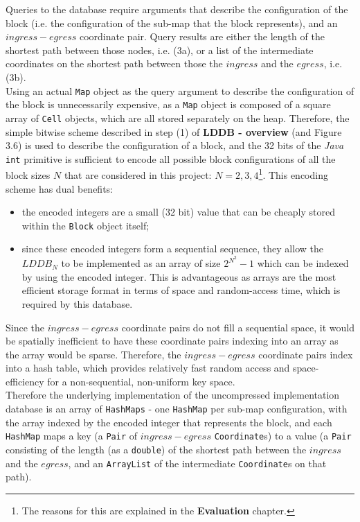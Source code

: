 \documentclass[12pt,notitlepage]{report}
\begin{document}
\noindent
Queries to the database require arguments that describe the configuration of the block (i.e. the configuration of the sub-map that the block represents), and an $ingress-egress$ coordinate pair. Query results are either the length of the shortest path between those nodes, i.e. (3a), or a list of the intermediate coordinates on the shortest path between those the $ingress$ and the $egress$, i.e. (3b).\\

\noindent
Using an actual {\tt Map} object as the query argument to describe the configuration of the block is unnecessarily expensive, as a {\tt Map} object is composed of a square array of {\tt Cell} objects, which are all stored separately on the heap. Therefore, the simple bitwise scheme described in step (1) of {\bfseries LDDB - overview} (and Figure 3.6) is used to describe the configuration of a block, and the 32 bits of the {\em Java} {\tt int} primitive is sufficient to encode all possible block configurations of all the block sizes $N$ that are considered in this project: $N=2, 3, 4$\footnote{The reasons for this are explained in the {\bfseries Evaluation} chapter.}. This encoding scheme has dual benefits:
\begin{itemize}
\item the encoded integers are a small (32 bit) value that can be cheaply stored within the {\tt Block} object itself;
\item since these encoded integers form a sequential sequence, they allow the $LDDB_{N}$ to be implemented as an array of size $2^{N^{2}}-1$ which can be indexed by using the encoded integer. This is advantageous as arrays are the most efficient storage format in terms of space and random-access time, which is required by this database.
\end{itemize}

\noindent
Since the $ingress-egress$ coordinate pairs do not fill a sequential space, it would be spatially inefficient to have these coordinate pairs indexing into an array as the array would be sparse. Therefore, the $ingress-egress$ coordinate pairs index into a hash table, which provides relatively fast random access and space-efficiency for a non-sequential, non-uniform key space.\\

\noindent
Therefore the underlying implementation of the uncompressed implementation database is an array of {\tt  HashMaps} - one {\tt HashMap} per sub-map configuration, with the array indexed by the encoded integer that represents the block, and each {\tt HashMap} maps a key (a {\tt Pair} of $ingress-egress$ {\tt Coordinate}s) to a value (a {\tt Pair} consisting of the length (as a {\tt double}) of the shortest path between the $ingress$ and the $egress$, and an {\tt ArrayList} of the intermediate {\tt Coordinate}s on that path).\\
\end{document}
